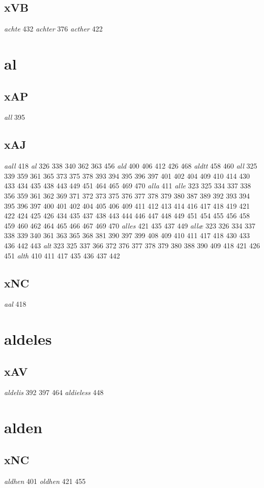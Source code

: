 \documentclass[a4paper,twocolumn]{article}
\begin{document}
\subsection{xVB}
\label{sec:org4c18894}
\emph{achte} 432 \emph{achter} 376 \emph{acther} 422 
\section{al}
\label{sec:org1c2e051}
\subsection{xAP}
\label{sec:orgecae44b}
\emph{all} 395 
\subsection{xAJ}
\label{sec:org932129f}
\emph{aall} 418 \emph{al} 326 338 340 362 363 456 \emph{ald} 400 406 412 426 468 \emph{aldtt} 458 460 \emph{all} 325 339 359 361 365 373 375 378 393 394 395 396 397 401 402 404 409 410 414 430 433 434 435 438 443 449 451 464 465 469 470 \emph{alla} 411 \emph{alle} 323 325 334 337 338 356 359 361 362 369 371 372 373 375 376 377 378 379 380 387 389 392 393 394 395 396 397 400 401 402 404 405 406 409 411 412 413 414 416 417 418 419 421 422 424 425 426 434 435 437 438 443 444 446 447 448 449 451 454 455 456 458 459 460 462 464 465 466 467 469 470 \emph{alles} 421 435 437 449 \emph{allæ} 323 326 334 337 338 339 340 361 363 365 368 381 390 397 399 408 409 410 411 417 418 430 433 436 442 443 \emph{alt} 323 325 337 366 372 376 377 378 379 380 388 390 409 418 421 426 451 \emph{alth} 410 411 417 435 436 437 442 
\subsection{xNC}
\label{sec:orgc27e801}
\emph{aal} 418 
\section{aldeles}
\label{sec:org4c90e85}
\subsection{xAV}
\label{sec:orgfd0bcc2}
\emph{aldelis} 392 397 464 \emph{aldieless} 448 
\section{alden}
\label{sec:orgc83f28d}
\subsection{xNC}
\label{sec:orgafc2b40}
\emph{aldhen} 401 \emph{oldhen} 421 455 
\end{document}

